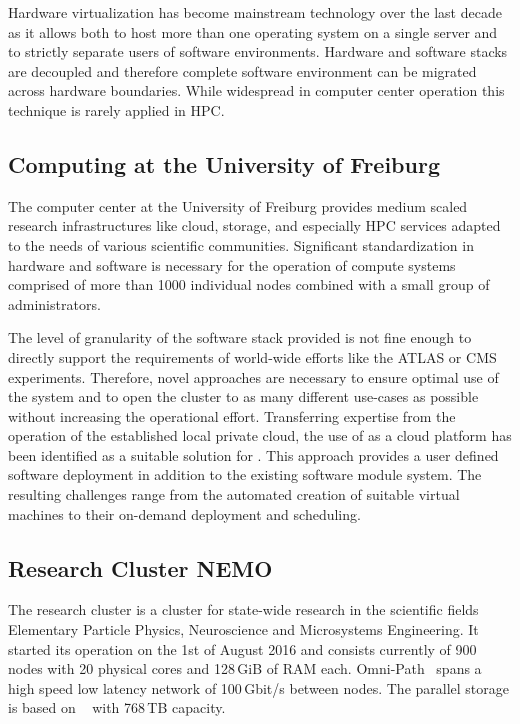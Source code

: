 Hardware virtualization has become mainstream technology over the last decade as it allows
both to host more than one operating system on a single server and to strictly
separate users of software environments.
Hardware and software stacks are decoupled and therefore complete software
environment can be migrated across hardware boundaries.
While widespread in computer center
operation this technique is rarely applied in HPC.

\subsection{Computing at the University of Freiburg}

The computer center at the University of Freiburg provides
medium scaled research
infrastructures like cloud, storage, and especially HPC services adapted to the
needs of various scientific communities. Significant standardization
in hardware and software is necessary for the operation of compute systems comprised of
more than 1000 individual nodes combined with a small group of administrators.

The level of granularity of the software stack provided is not fine enough to
directly support the requirements of world-wide efforts like the
ATLAS or CMS experiments.
Therefore, novel approaches are necessary to ensure optimal use of the system and to open the cluster to as many different use-cases as
possible without increasing the operational effort.
Transferring expertise from the operation of the established local
private cloud, %
the use of \Openstack as a cloud platform has been identified
as a
suitable solution for \NEMO. This approach provides a user defined software
deployment in addition to the existing software module system.
The resulting challenges range from the automated creation of suitable
virtual machines to their on-demand deployment and scheduling.

\subsection{Research Cluster NEMO}

The research cluster \NEMO is a cluster for state-wide
research in the scientific fields Elementary Particle Physics, Neuroscience and
Microsystems Engineering. It started its operation on the 1st of August 2016
and consists currently of 900 nodes with 20 physical cores and 128\,GiB of RAM each.
Omni-Path~\cite{Omnipath} spans a high speed low latency network of 100\,Gbit/s between nodes.
The parallel storage is based on \BeeGFS~\cite{BeeGFS} with
768\,TB capacity.


